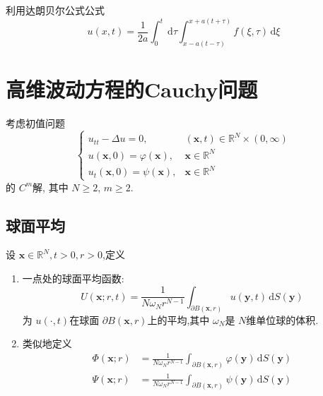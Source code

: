 \documentclass[../../PDE.tex]{subfiles}
\begin{document}
\begin{note}
    利用达朗贝尔公式公式 \[
    u\left( x,t \right)= \frac{1 }{2a }\int_{0}^{t}\,\mathrm{d} \tau \int_{x-a\left( t-\tau  \right) }^{x+ a\left( t+ \tau  \right) }f\left(  \xi ,\tau  \right)\,\mathrm{d}  \xi    
    \]
\end{note}


\section{高维波动方程的Cauchy问题}

考虑初值问题 \[
\begin{cases} u_{tt}- \Delta u= 0,&\left( \mathbf{x},t \right)\in \mathbb{R} ^{N}\times \left( 0,\infty \right)\\ 
 u\left( \mathbf{x},0 \right)=  \varphi \left( \mathbf{x} \right),&\mathbf{x}\in \mathbb{R} ^{N}\\ 
  u_{t}\left( \mathbf{x},0 \right)= \psi \left( \mathbf{x} \right),&\mathbf{x}\in \mathbb{R} ^{N}       \end{cases} 
\]的 \(  C^{m}  \)解, 其中 \(  N\ge 2  \),   \(  m\ge 2  \). 

\subsection{球面平均}


\begin{definition}
    设 \(  \mathbf{x} \in \mathbb{R} ^{N}, t> 0,r> 0 \),定义 
    \begin{enumerate}
        \item 一点处的球面平均函数: \[
        U\left( \mathbf{x};r,t \right)= \frac{1 }{N \omega _{N}r^{N-1} } \int_{ \partial B\left( \mathbf{x},r \right) }   u\left( \mathbf{y},t \right)\,\mathrm{d} S\left( \mathbf{y} \right)    
        \]为 \(  u\left( \cdot ,t \right)   \)在球面 \(   \partial B\left( \mathbf{x},r \right)   \)上的平均,其中 \(   \omega _{N}  \)是 \(  N  \)维单位球的体积.
        \item 类似地定义 \[
        \begin{aligned}
        \Phi \left( \mathbf{x};r \right)&= \frac{1 }{N \omega _{N}r^{N-1} }\int_{ \partial B\left( \mathbf{x},r \right) } \varphi \left( \mathbf{y} \right)\,\mathrm{d} S\left( \mathbf{y} \right)     \\ 
         \Psi \left( \mathbf{x};r \right)& =  \frac{1 }{N \omega _{N}r^{N-1} }\int_{ \partial B\left( \mathbf{x},r \right) }\psi \left( \mathbf{y} \right)\,\mathrm{d} S\left( \mathbf{y} \right)    
        \end{aligned}
        \]    
        
        
    \end{enumerate}
    
\end{definition}
\end{document}

